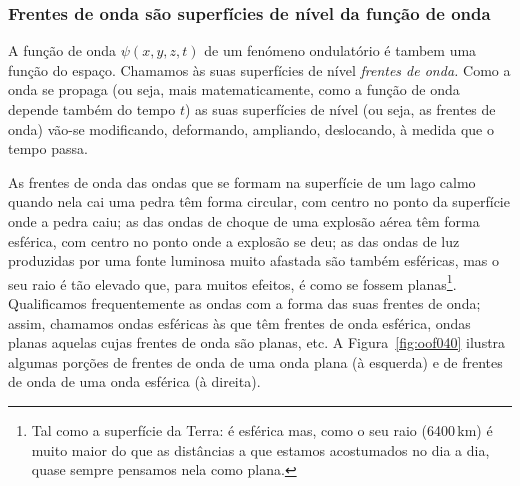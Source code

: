\subsubsection*{Frentes de onda são superfícies de nível da função de onda}
A função de onda $\psi(x,y,z,t)$ de um fenómeno ondulatório é tambem uma função
do espaço. Chamamos às suas superfícies de nível \emph{frentes de onda.} Como a
onda se propaga (ou seja, mais matematicamente, como a função de onda depende
também do tempo $t$) as suas superfícies de nível (ou seja, as frentes de onda)
vão-se modificando, deformando, ampliando, deslocando, à medida que o tempo
passa.

As frentes de onda das ondas que se formam na superfície de um lago calmo quando
nela cai uma pedra têm forma circular, com centro no ponto da superfície onde a
pedra caiu; as das ondas de choque de uma explosão aérea têm forma esférica, com
centro no ponto onde a explosão se deu; as das ondas de luz produzidas por uma
fonte luminosa muito afastada são também esféricas, mas o seu raio é tão elevado
que, para muitos efeitos, é como se fossem planas\footnote{Tal como a superfície
  da Terra: é esférica mas, como o seu raio (6400\,km) é muito maior do que as
  distâncias a que estamos acostumados no dia a dia, quase sempre pensamos nela
como plana.}. Qualificamos frequentemente as ondas com a forma das suas frentes
de onda; assim, chamamos ondas esféricas às que têm frentes de onda esférica,
ondas planas aquelas cujas frentes de onda são planas, etc. A
Figura~\ref{fig:oof040} ilustra algumas porções de frentes de onda de uma onda
plana (à esquerda) e de frentes de onda de uma onda esférica (à direita).
